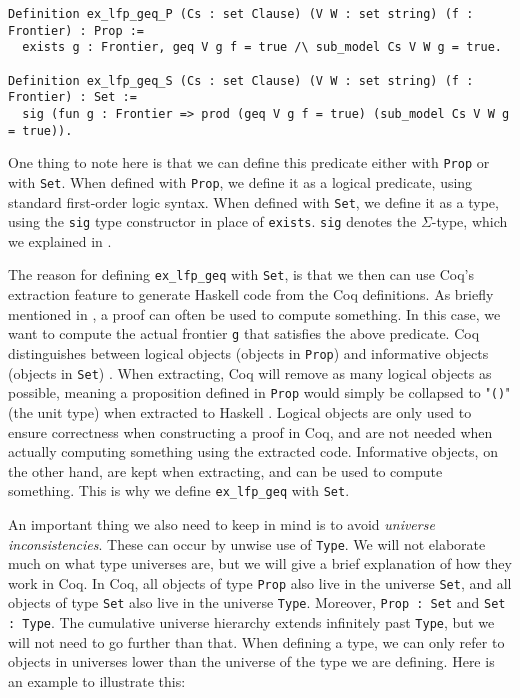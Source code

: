 \begin{minipage}{\linewidth}
\begin{lstlisting}[language=Coq, label={lst:ex_lfp_geq_def}, caption={\lstinline{ex_lfp_geq} in Coq, using both \lstinline{Prop} and \lstinline{Set}}]
Definition ex_lfp_geq_P (Cs : set Clause) (V W : set string) (f : Frontier) : Prop :=
  exists g : Frontier, geq V g f = true /\ sub_model Cs V W g = true.

Definition ex_lfp_geq_S (Cs : set Clause) (V W : set string) (f : Frontier) : Set :=
  sig (fun g : Frontier => prod (geq V g f = true) (sub_model Cs V W g = true)).
\end{lstlisting}
\end{minipage}

One thing to note here is that we can define this predicate either with \lstinline{Prop} or with \lstinline{Set}.
When defined with \lstinline{Prop}, we define it as a logical predicate, using standard first-order logic syntax.
When defined with \lstinline{Set}, we define it as a type,
using the \lstinline{sig} type constructor in place of \lstinline{exists}.
\lstinline{sig} denotes the $\Sigma$-type, which we explained in .

The reason for defining \lstinline{ex_lfp_geq} with \lstinline{Set}, is that we then can use
Coq's extraction feature to generate Haskell code from the Coq definitions.
As briefly mentioned in , a proof can often be used to compute something.
In this case, we want to compute the actual frontier \lstinline{g} that satisfies the above predicate.
Coq distinguishes between logical objects (objects in \lstinline{Prop}) and informative objects (objects in \lstinline{Set})
\cite[p.~1-2]{coqextrnew}.
When extracting, Coq will remove as many logical objects as possible, meaning a proposition defined in \lstinline{Prop}
would simply be collapsed to "\lstinline[language=Haskell]{()}" (the unit type) when extracted to Haskell
\cite[p.~8]{coqextroverview}.
Logical objects are only used to ensure correctness when constructing a proof in Coq,
and are not needed when actually computing something using the extracted code.
Informative objects, on the other hand, are kept when extracting, and can be used to compute something.
This is why we define \lstinline{ex_lfp_geq} with \lstinline{Set}.

An important thing we also need to keep in mind is to avoid \emph{universe inconsistencies}.
These can occur by unwise use of \lstinline{Type}.
We will not elaborate much on what type universes are, but we will give a brief explanation of how they work in Coq.
In Coq, all objects of type \lstinline{Prop} also live in the universe \lstinline{Set}, and all objects of type \lstinline{Set}
also live in the universe \lstinline{Type}.
Moreover, \lstinline{Prop : Set} and \lstinline{Set : Type}.
The cumulative universe hierarchy extends infinitely past \lstinline{Type}, but we will not
need to go further than that.
When defining a type, we can only refer to objects in universes lower than the universe of the type we are defining.
Here is an example to illustrate this:

